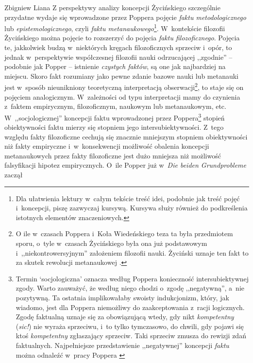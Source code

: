 \begin{artplenv}{Zbigniew Liana}
Z perspektywy analizy koncepcji Życińskiego szczególnie przydatne wydaje się wprowadzone przez Poppera pojęcie
\textit{faktu metodologicznego} lub \textit{epistemologicznego}, czyli \textit{faktu metanaukowego}\footnote{Dla ułatwienia
lektury w~całym tekście treść idei, podobnie jak treść pojęć i~koncepcji, piszę zazwyczaj kursywą. Kursywa służy
również do podkreślenia istotnych elementów znaczeniowych.}. W~kontekście filozofii Życińskiego można pojęcie to
rozszerzyć do pojęcia \textit{faktu filozoficznego}. Pojęcia te, jakkolwiek budzą w~niektórych kręgach filozoficznych
sprzeciw i~opór, to jednak w~perspektywie współczesnej filozofii nauki odrzucającej ,,zgodnie'' -- podobnie jak Popper --
istnienie \textit{czystych faktów}, są one jak najbardziej na miejscu. Skoro fakt rozumiany jako pewne zdanie bazowe
nauki lub metanauki jest w~sposób nieunikniony teoretyczną interpretacją obserwacji\footnote{\label{lia-foo-12}O ile w~czasach Poppera i~Koła
Wiedeńskiego teza ta była przedmiotem sporu, o~tyle w~czasach Życińskiego była ona już podstawowym i~,,niekontrowersyjnym''
założeniem filozofii nauki. Życiński uznaje ten fakt to za skutek rewolucji metanaukowej
\parencite[zob.][s.~127]{zycinski_elementy_1996}.
}, to staje się on pojęciem analogicznym. W~zależności od
typu interpretacji mamy do czynienia z~faktem empirycznym, filozoficznym, naukowym lub metanaukowym,
etc. W~,,socjologicznej'' koncepcji faktu wprowadzonej przez Poppera\footnote{Termin `socjologiczna' oznacza według Poppera
konieczność intersubiektywnej zgody. Warto zauważyć, że według niego chodzi o~zgodę ,,negatywną'', a~nie pozytywną. Ta
ostatnia implikowałaby swoisty indukcjonizm, który, jak wiadomo, jest dla Poppera niemożliwy do zaakceptowania z~racji
logicznych. Zgodę faktualną uznaje się za obowiązującą wtedy, gdy nikt \textit{kompetentny} (\textit{sic!}) nie wyraża
sprzeciwu, i~to tylko tymczasowo, do chwili, gdy pojawi się ktoś \textit{kompetentny} zgłaszający sprzeciw. Taki sprzeciw
zmusza do rewizji zdań faktualnych. Najpełniejsze przedstawienie ,,negatywnej'' koncepcji \textit{faktu} można odnaleźć w~pracy Poppera
\parencite*[s.~122–135, zwł. 131n.]{popper_beiden_1979}
} stopień obiektywności faktu mierzy się stopniem
jego intersubiektywności. Z~tego względu fakty filozoficzne cechują się znacznie mniejszym stopniem obiektywności niż
fakty empiryczne i~w~konsekwencji możliwość obalenia koncepcji metanaukowych przez fakty filozoficzne jest dużo
mniejsza niż możliwość falsyfikacji hipotez empirycznych. O~ile Popper już w~\textit{Die beiden Grundprobleme} zaczął

\end{artplenv}
